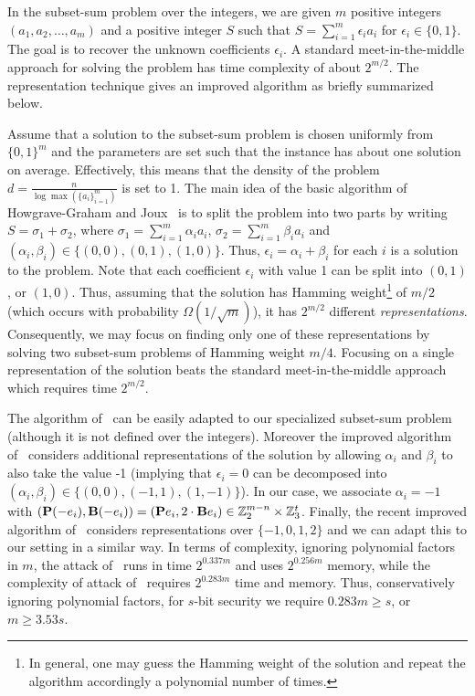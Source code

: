 In the subset-sum problem over the integers, we are given $m$ positive integers $(a_1,a_2,\ldots,a_m)$ and a positive integer $S$ such that $S = \sum_{i=1}^{m} \epsilon_i a_i$ for $\epsilon_i \in \{0,1\}$. The goal is to recover the unknown coefficients $\epsilon_i$. A standard meet-in-the-middle approach for solving the problem has time complexity of about $2^{m/2}$. The representation technique gives an improved algorithm as briefly summarized below.

Assume that a solution to the subset-sum problem is chosen uniformly from $\{0,1\}^m$ and the parameters are set such that the instance has about one solution on average. Effectively, this means that the density of the problem $d = \tfrac{n}{\log \max(\{a_i\}_{i=1}^{m})}$ is set to 1. The main idea of the basic algorithm of Howgrave{-}Graham and Joux~\cite{Howgrave-GrahamJ10} is to split the problem into two parts by writing $S = \sigma_1 + \sigma_2$, where $\sigma_1 = \sum_{i=1}^{m} \alpha_i a_i$, $\sigma_2 = \sum_{i=1}^{m} \beta_i a_i$ and $(\alpha_i,\beta_i) \in \{(0,0),(0,1),(1,0)\}$. Thus, $\epsilon_i = \alpha_i + \beta_i$ for each $i$ is a solution to the problem. Note that each coefficient $\epsilon_i$ with value 1 can be split into $(0,1)$, or $(1,0)$. Thus, assuming that the solution has Hamming weight\footnote{In general, one may guess the Hamming weight of the solution and repeat the algorithm accordingly a polynomial number of times.} of $m/2$ (which occurs with probability $\Omega(1/\sqrt{m})$), it has $2^{m/2}$ different \emph{representations}. Consequently, we may focus on finding only one of these representations by solving two subset-sum problems of Hamming weight $m/4$. Focusing on a single representation of the solution beats the standard meet-in-the-middle approach which requires time $2^{m/2}$.

The algorithm of~\cite{Howgrave-GrahamJ10} can be easily adapted to our specialized subset-sum problem (although it is not defined over the integers). Moreover the improved algorithm of~\cite{BeckerCJ11} considers additional representations of the solution by allowing $\alpha_i$ and $\beta_i$ to also take the value -1 (implying that $\epsilon_i = 0$ can be decomposed into $(\alpha_i,\beta_i) \in \{(0,0),(-1,1),(1,-1)\}$). In our case, we associate $\alpha_i = -1$ with $(\mat{P}(-e_i), \mat{B}(-e_i)) = (\mat{P}e_i, 2 \cdot \mat{B}e_i)  \in \Z_2^{m-n} \times \Z_3^t$. Finally, the recent improved algorithm of~\cite{BonnetainBSS20} considers representations over $\{-1,0,1,2\}$ and we can adapt this to our setting in a similar way. In terms of complexity, ignoring polynomial factors in $m$, the attack of~\cite{Howgrave-GrahamJ10} runs in time $2^{0.337m}$ and uses $2^{0.256m}$ memory, while the complexity of attack of~\cite{BonnetainBSS20} requires $2^{0.283m}$ time and memory. Thus, conservatively ignoring polynomial factors, for $s$-bit security we require $0.283m \geq s$, or $m \geq 3.53 s$.



